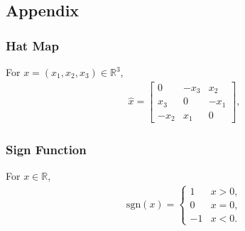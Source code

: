 \documentclass[10pt,draft]{article}
\renewcommand{\Re}{\ensuremath{\mathbb{R}}}
\begin{document}



\appendix

\subsection*{Appendix}

\subsubsection*{Hat Map}

For $x=(x_1,x_2,x_3)\in\Re^3$, 
\begin{align}
    \hat x = \begin{bmatrix}
        0 & -x_3 & x_2 \\
        x_3 & 0 & -x_1 \\
        -x_2 & x_1 & 0 
    \end{bmatrix},
\end{align}


\subsubsection*{Sign Function}

For $x\in\Re$, 
\begin{align}
    \mathrm{sgn}(x) =
    \begin{cases}
        1 &  x>0,\\
        0 &  x=0,\\
        -1 & x<0.
    \end{cases}
\end{align}
\end{document}
